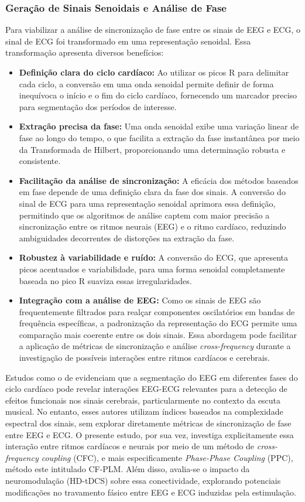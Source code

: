 \subsubsection{Geração de Sinais Senoidais e Análise de Fase}
Para viabilizar a análise de sincronização de fase entre os sinais de EEG e ECG, o sinal de ECG foi transformado em uma representação senoidal. Essa transformação apresenta diversos benefícios:
\begin{itemize}
    \item \textbf{Definição clara do ciclo cardíaco:} Ao utilizar os picos R para delimitar cada ciclo, a conversão em uma onda senoidal permite definir de forma inequívoca o início e o fim do ciclo cardíaco, fornecendo um marcador preciso para segmentação dos períodos de interesse.
    \item \textbf{Extração precisa da fase:} Uma onda senoidal exibe uma variação linear de fase ao longo do tempo, o que facilita a extração da fase instantânea por meio da Transformada de Hilbert, proporcionando uma determinação robusta e consistente.
    \item \textbf{Facilitação da análise de sincronização:} A eficácia dos métodos baseados em fase depende de uma definição clara da fase dos sinais. A conversão do sinal de ECG para uma representação senoidal aprimora essa definição, permitindo que os algoritmos de análise captem com maior precisão a sincronização entre os ritmos neurais (EEG) e o ritmo cardíaco, reduzindo ambiguidades decorrentes de distorções na extração da fase.
    \item \textbf{Robustez à variabilidade e ruído:} A conversão do ECG, que apresenta picos acentuados e variabilidade, para uma forma senoidal completamente baseada no pico R suaviza essas irregularidades.
    \item \textbf{Integração com a análise de EEG:} Como os sinais de EEG são frequentemente filtrados para realçar componentes oscilatórios em bandas de frequência específicas, a padronização da representação do ECG permite uma comparação mais coerente entre os dois sinais. Essa abordagem pode facilitar a aplicação de métricas de sincronização e análise \textit{cross-frequency} durante a investigação de possíveis interações entre ritmos cardíacos e cerebrais.
\end{itemize}

Estudos como o de  evidenciam que a segmentação do EEG em diferentes fases do ciclo cardíaco pode revelar interações EEG-ECG relevantes para a detecção de efeitos funcionais nos sinais cerebrais, particularmente no contexto da escuta musical. No entanto, esses autores utilizam índices baseados na complexidade espectral dos sinais, sem explorar diretamente métricas de sincronização de fase entre EEG e ECG. O presente estudo, por sua vez, investiga explicitamente essa interação entre ritmos cardíacos e neurais por meio de um método de \textit{cross-frequency coupling} (CFC), e mais especificamente \textit{Phase-Phase Coupling} (PPC), método este intitulado CF-PLM. Além disso, avalia-se o impacto da neuromodulação (HD-tDCS) sobre essa conectividade, explorando potenciais modificações no travamento fásico entre EEG e ECG induzidas pela estimulação.

